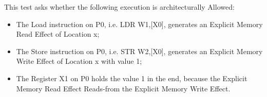 This test asks whether the following execution is architecturally Allowed:

\begin{itemize}
  \item The Load instruction on P0, i.e. LDR W1,[X0], generates an Explicit Memory Read Effect of Location x;
  \item The Store instruction on P0, i.e. STR W2,[X0], generates an Explicit Memory Write Effect of Location x with value 1;
  \item The Register X1 on P0 holds the value 1 in the end, because the Explicit Memory Read Effect Reads-from the Explicit Memory Write Effect.
\end{itemize}
